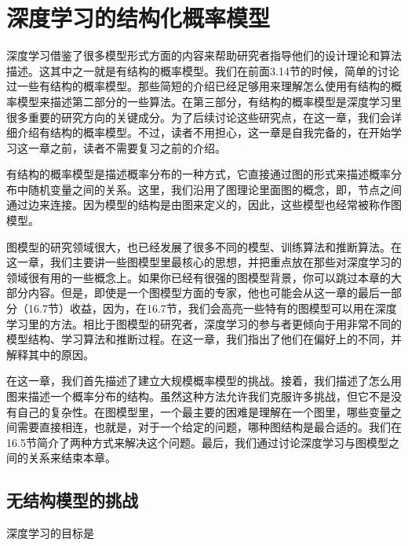 \chapter{深度学习的结构化概率模型}
\label{chap:16}
深度学习借鉴了很多模型形式方面的内容来帮助研究者指导他们的设计理论和算法描述。这其中之一就是有结构的概率模型。我们在前面3.14节的时候，简单的讨论过一些有结构的概率模型。那些简短的介绍已经足够用来理解怎么使用有结构的概率模型来描述第二部分的一些算法。在第三部分，有结构的概率模型是深度学习里很多重要的研究方向的关键成分。为了后续讨论这些研究点，在这一章，我们会详细介绍有结构的概率模型。不过，读者不用担心，这一章是自我完备的，在开始学习这一章之前，读者不需要复习之前的介绍。

有结构的概率模型是描述概率分布的一种方式，它直接通过图的形式来描述概率分布中随机变量之间的关系。这里，我们沿用了图理论里面图的概念，即，节点之间通过边来连接。因为模型的结构是由图来定义的，因此，这些模型也经常被称作图模型。

图模型的研究领域很大，也已经发展了很多不同的模型、训练算法和推断算法。在这一章，我们主要讲一些图模型里最核心的思想，并把重点放在那些对深度学习的领域很有用的一些概念上。如果你已经有很强的图模型背景，你可以跳过本章的大部分内容。但是，即使是一个图模型方面的专家，他也可能会从这一章的最后一部分（16.7节）收益，因为，在16.7节，我们会高亮一些特有的图模型可以用在深度学习里的方法。相比于图模型的研究者，深度学习的参与者更倾向于用非常不同的模型结构、学习算法和推断过程。在这一章，我们指出了他们在偏好上的不同，并解释其中的原因。

在这一章，我们首先描述了建立大规模概率模型的挑战。接着，我们描述了怎么用图来描述一个概率分布的结构。虽然这种方法允许我们克服许多挑战，但它不是没有自己的复杂性。在图模型里，一个最主要的困难是理解在一个图里，哪些变量之间需要直接相连，也就是，对于一个给定的问题，哪种图结构是最合适的。我们在16.5节简介了两种方式来解决这个问题。最后，我们通过讨论深度学习与图模型之间的关系来结束本章。

\section{无结构模型的挑战}
深度学习的目标是






